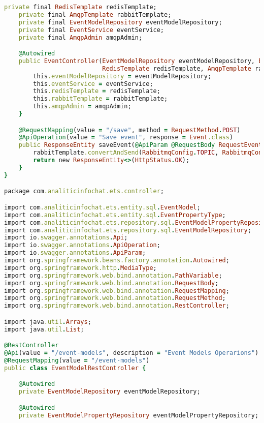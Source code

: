 \begin{lstlisting}[language=Ruby, style=rubystyle]
    private final RedisTemplate redisTemplate;
    private final AmqpTemplate rabbitTemplate;
    private final EventModelRepository eventModelRepository;
    private final EventService eventService;
    private final AmqpAdmin amqpAdmin;

    @Autowired
    public EventController(EventModelRepository eventModelRepository, EventService eventService,
                           RedisTemplate redisTemplate, AmqpTemplate rabbitTemplate, AmqpAdmin amqpAdmin) {
        this.eventModelRepository = eventModelRepository;
        this.eventService = eventService;
        this.redisTemplate = redisTemplate;
        this.rabbitTemplate = rabbitTemplate;
        this.amqpAdmin = amqpAdmin;
    }

    @RequestMapping(value = "/save", method = RequestMethod.POST)
    @ApiOperation(value = "Save event", response = Event.class)
    public ResponseEntity saveEvent(@ApiParam @RequestBody RequestEventApiDto requestEventApiDto) {
        rabbitTemplate.convertAndSend(RabbitmqConfig.TOPIC, RabbitmqConfig.QUEUE_NAME, requestEventApiDto);
        return new ResponseEntity<>(HttpStatus.OK);
    }
}

package com.analiticinfochat.ets.controller;

import com.analiticinfochat.ets.entity.sql.EventModel;
import com.analiticinfochat.ets.entity.sql.EventPropertyType;
import com.analiticinfochat.ets.repository.sql.EventModelPropertyRepository;
import com.analiticinfochat.ets.repository.sql.EventModelRepository;
import io.swagger.annotations.Api;
import io.swagger.annotations.ApiOperation;
import io.swagger.annotations.ApiParam;
import org.springframework.beans.factory.annotation.Autowired;
import org.springframework.http.MediaType;
import org.springframework.web.bind.annotation.PathVariable;
import org.springframework.web.bind.annotation.RequestBody;
import org.springframework.web.bind.annotation.RequestMapping;
import org.springframework.web.bind.annotation.RequestMethod;
import org.springframework.web.bind.annotation.RestController;

import java.util.Arrays;
import java.util.List;

@RestController
@Api(value = "/event-models", description = "Event Models Operarions")
@RequestMapping(value = "/event-models")
public class EventModelRestController {

    @Autowired
    private EventModelRepository eventModelRepository;

    @Autowired
    private EventModelPropertyRepository eventModelPropertyRepository;


\end{lstlisting}
